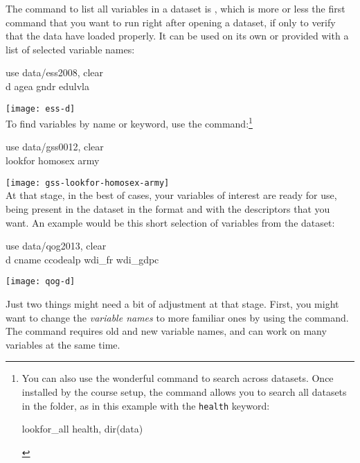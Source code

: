 The command to list all variables in a dataset is , which is more or less the first command that you want to run right after opening a dataset, if only to verify that the data have loaded properly. It can be used on its own or provided with a list of selected variable names:\\[1em]

\begin{docspec}
	use data/ess2008, clear\\
	d agea gndr edulvla
\end{docspec}

\texttt{[image: ess-d]}\\[1em]

To find variables by name or keyword, use the  command:\footnote{You can also use the wonderful  command to search across datasets. Once installed by the course setup, the command allows you to search all datasets in the \data folder, as in this example with the \texttt{health} keyword:%
		\begin{docspec}
			lookfor\_all health, dir(data)
		\end{docspec}}\\[1em]

\begin{docspec}
	use data/gss0012, clear\\
	lookfor homosex army
\end{docspec}

\texttt{[image: gss-lookfor-homosex-army]}\\[1em]

At that stage, in the best of cases, your variables of interest are ready for use, being present in the dataset in the format and with the descriptors that you want. An example would be this short selection of variables from the \QOG dataset:

	\begin{docspec}
		use data/qog2013, clear\\
		d cname ccodealp wdi\_fr wdi\_gdpc
	\end{docspec}
	
	\texttt{[image: qog-d]}

Just two things might need a bit of adjustment at that stage. First, you might want to change the \emph{variable names} to more familiar ones by using the  command. The command requires old and new variable names, and can work on many variables at the same time.%

